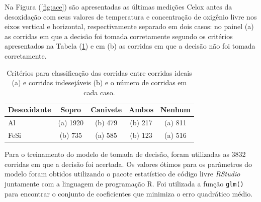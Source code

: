 	Na Figura (\ref{fig:ace}) são apresentadas as últimas medições Celox antes da desoxidação com seus valores de temperatura e concentração de oxigênio livre nos eixos vertical e horizontal, respectivamente separado em dois casos: no painel (a) as corridas em que a decisão foi tomada corretamente segundo os critérios apresentados na Tabela (\ref{tab:um}) e em (b) as corridas em que a decisão não foi tomada corretamente. 	
	\begin{table}[H]		
		\caption{Critérios para classificação das corridas entre corridas ideais (a) e corridas indesejáveis (b) e o número de corridas em cada caso.}
		\label{tab:um} %
		\begin{tabular}{lcccc}
		\hline 
		Desoxidante 					& Sopro                & Canivete             & Ambos                & Nenhum               \\
		\hline \hline 
		Al                              & (a) 1920             & (b) 479              & (b) 217              & (a) 811              \\
		FeSi                            & (b) 735              & (a) 585              & (b) 123              & (a) 516              \\
		\hline 
		\end{tabular}
	\end{table}	
	Para o treinamento do modelo de tomada de decisão, foram utilizadas as 3832 corridas em que a decisão foi acertada.	Os valores ótimos para os parâmetros do modelo foram obtidos utilizando o pacote estatístico de código livre \textit{RStudio} juntamente com a linguagem de programação R\cite{rprog}. Foi utilizada a função \texttt{glm()} para encontrar o conjunto de coeficientes que minimiza o erro quadrático médio.
